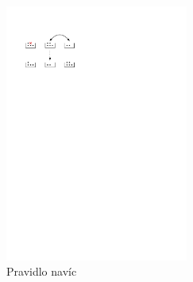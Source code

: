 \documentclass[10pt]{article}
\theoremstyle{definitionstyle}
\theoremstyle{problemstyle}
\begin{document}
\vspace{1cm}

\begin{figure}[h]
    \centering
    \includegraphics[width=6cm]{hazard_rule_2.pdf}
    \caption{Pravidlo navíc}
\end{figure}
\end{document}

